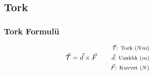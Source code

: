 \subsection{Tork}

\subsubsection*{Tork Formulü}
\begin{equation}
    \vec{\mathcal{T}} = \vec{d} \times \vec{F} \quad \quad \parbox{4cm}{\footnotesize$\begin{aligned}
        \vec{\mathcal{T}}\text{: Tork } (N m) \\
        \vec{d}\text{: Uzaklık } (m) \\
        \vec{F}\text{: Kuvvet } (N)
    \end{aligned}$}
\end{equation}